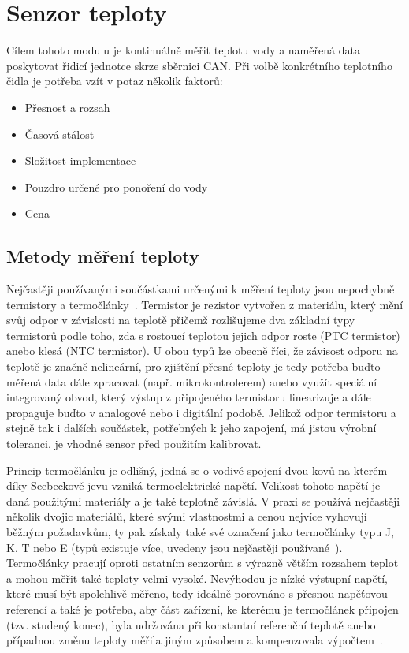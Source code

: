 \section{Senzor teploty}
\label{sec:perif-sensor-teploty}
    Cílem tohoto modulu je kontinuálně měřit teplotu vody a naměřená data poskytovat řidicí jednotce skrze sběrnici CAN. Při volbě konkrétního teplotního čidla je potřeba vzít v potaz několik faktorů:
    \begin{itemize}
        \item Přesnost a rozsah
        \item Časová stálost
        \item Složitost implementace 
        \item Pouzdro určené pro ponoření do vody
        \item Cena
    \end{itemize}

    \subsection{Metody měření teploty}
        Nejčastěji používanými součástkami určenými k měření teploty jsou nepochybně termistory a termočlánky~\cite{allaboutcircuits2023tempsensors}. Termistor je rezistor vytvořen z materiálu, který mění svůj odpor v závislosti na teplotě přičemž rozlišujeme dva základní typy termistorů podle toho, zda s rostoucí teplotou jejich odpor roste (PTC termistor) anebo klesá (NTC termistor). U obou typů lze obecně říci, že závisost odporu na teplotě je značně nelineární, pro zjištění přesné teploty je tedy potřeba buďto měřená data dále zpracovat (např. mikrokontrolerem) anebo využít speciální integrovaný obvod, který výstup z připojeného termistoru linearizuje a dále propaguje buďto v analogové nebo i digitální podobě. Jelikož odpor termistoru a stejně tak i dalších součástek, potřebných k jeho zapojení, má jistou výrobní toleranci, je vhodné sensor před použitím kalibrovat.

        Princip termočlánku je odlišný, jedná se o vodivé spojení dvou kovů na kterém díky Seebeckově jevu vzniká termoelektrické napětí. Velikost tohoto napětí je daná použitými materiály a je také teplotně závislá. V praxi se používá nejčastěji několik dvojic materiálů, které svými vlastnostmi a cenou nejvíce vyhovují běžným požadavkům, ty pak získaly také své označení jako termočlánky typu J, K, T nebo E (typů existuje více, uvedeny jsou nejčastěji používané~\cite{TechieScience_Thermocouples}). Termočlánky pracují oproti ostatním senzorům s výrazně větším rozsahem teplot a mohou měřit také teploty velmi vysoké. Nevýhodou je nízké výstupní napětí, které musí být spolehlivě měřeno, tedy ideálně porovnáno s přesnou napěťovou referencí a také je potřeba, aby část zařízení, ke kterému je termočlánek připojen (tzv. studený konec), byla udržována při konstantní referenční teplotě anebo případnou změnu teploty měřila jiným způsobem a kompenzovala výpočtem~\cite{allaboutcircuits2023tempsensors,TechieScience_Thermocouples}.

